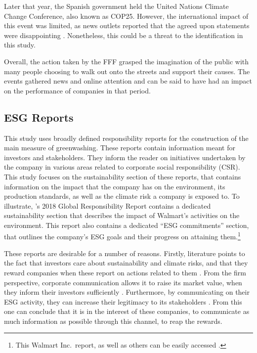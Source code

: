 \documentclass[12pt]{article}
\begin{document}
Later that year, the Spanish government held the United Nations Climate Change Conference, also known as COP25. However, the international impact of this event was limited, as news outlets reported that the agreed upon statements were disappointing \parencite{SenguptaCOP252019}. Nonetheless, this could be a threat to the identification in this study.

Overall, the action taken by the FFF grasped the imagination of the public with many people choosing to walk out onto the streets and support their causes. The events gathered news and online attention and can be said to have had an impact on the performance of companies in that period.


\subsection{ESG Reports}


This study uses broadly defined responsibility reports for the construction of the main measure of greenwashing. These reports contain information meant for investors and stakeholders. They inform the reader on initiatives undertaken by the company in various areas related to corporate social responsibility (CSR). This study focuses on the sustainability section of these reports, that contains information on the impact that the company has on the environment, its production standards, as well as the climate risk a company is exposed to. To illustrate, \citeauthor{walmart2018csr}'s 2018 Global Responsibility Report contains a dedicated sustainability section that describes the impact of Walmart's activities on the environment. This report also contains a dedicated ``ESG commitments'' section, that outlines the company's ESG goals and their progress on attaining them.\footnote{This Walmart Inc.~report, as well as others can be easily accessed \href{https://www.responsibilityreports.com/Company/walmart-inc}{}.}

These reports are desirable for a number of reasons. Firstly, literature points to the fact that investors care about sustainability and climate risks, and that they reward companies when these report on actions related to them \parencite{ilhanClimateRiskDisclosure2023,kruegerImportanceClimateRisks2020,pastorSustainableInvestingEquilibrium2021,testaDoesItPay2018}. From the firm perspective, corporate communication allows it to raise its market value, when they inform their investors sufficiently \parencite{servaesImpactCorporateSocial2013}. Furthermore, by communicating on their ESG activity, they can increase their legitimacy to its stakeholders \parencite{torelliGreenwashingEnvironmentalCommunication2020}. From this one can conclude that it is in the interest of these companies, to communicate as much information as possible through this channel, to reap the rewards. 
\end{document}
